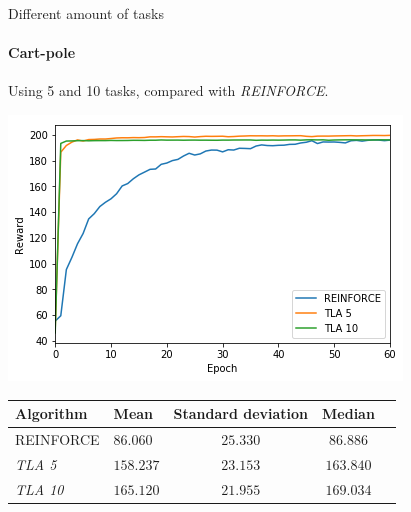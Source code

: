 \begin{frame}[fragile]{Different amount of tasks}
\framesubtitle{Cart-pole}
Using 5 and 10 tasks, compared with \textit{REINFORCE}.
\begin{center}
    \includegraphics[width=.6\linewidth]{results/CartPole/no_sparse_transfer/reward_target_re-akt5-akt10.png}
\end{center}
\begin{tabular}{llccc}
\hline
Algorithm & Mean & Standard deviation & Median \\
\hline
   REINFORCE  & $86.060$ & $25.330$ & $86.886$ \\
   \textit{TLA 5} & $158.237$ & $23.153$ & $163.840$ \\
   \textit{TLA 10} & $\bm{165.120}$ & $21.955$ & $\bm{169.034}$ \\
\hline
\end{tabular}
\end{frame}

